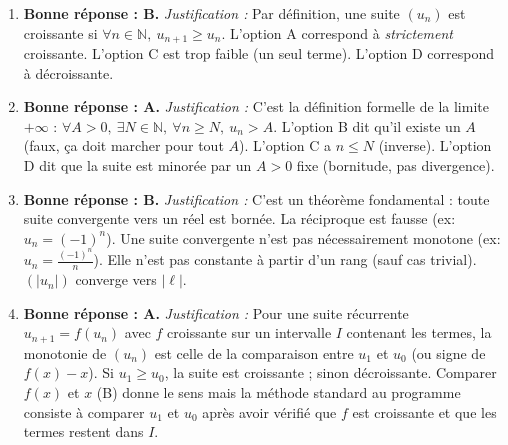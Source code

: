 \documentclass[11pt]{article}
\begin{document}
\begin{corrige}
\begin{enumerate}
    \item \textbf{Bonne réponse : B.}
    \emph{Justification :} Par définition, une suite $(u_n)$ est croissante si $\forall n \in \mathbb{N},\ u_{n+1} \ge u_n$. L'option A correspond à \emph{strictement} croissante. L'option C est trop faible (un seul terme). L'option D correspond à décroissante.
    \item \textbf{Bonne réponse : A.}
    \emph{Justification :} C'est la définition formelle de la limite $+\infty$ : $\forall A > 0,\ \exists N \in \mathbb{N},\ \forall n \ge N,\ u_n > A$. L'option B dit qu'il existe un $A$ (faux, ça doit marcher pour tout $A$). L'option C a $n \le N$ (inverse). L'option D dit que la suite est minorée par un $A>0$ fixe (bornitude, pas divergence).
    \item \textbf{Bonne réponse : B.}
    \emph{Justification :} C'est un théorème fondamental : toute suite convergente vers un réel est bornée. La réciproque est fausse (ex: $u_n = (-1)^n$). Une suite convergente n'est pas nécessairement monotone (ex: $u_n = \frac{(-1)^n}{n}$). Elle n'est pas constante à partir d'un rang (sauf cas trivial). $(|u_n|)$ converge vers $|\ell|$.
    \item \textbf{Bonne réponse : A.}
    \emph{Justification :} Pour une suite récurrente $u_{n+1}=f(u_n)$ avec $f$ croissante sur un intervalle $I$ contenant les termes, la monotonie de $(u_n)$ est celle de la comparaison entre $u_1$ et $u_0$ (ou signe de $f(x)-x$). Si $u_1 \ge u_0$, la suite est croissante ; sinon décroissante. Comparer $f(x)$ et $x$ (B) donne le sens mais la méthode standard au programme consiste à comparer $u_1$ et $u_0$ après avoir vérifié que $f$ est croissante et que les termes restent dans $I$.
\end{enumerate}
\end{corrige}
\end{document}
